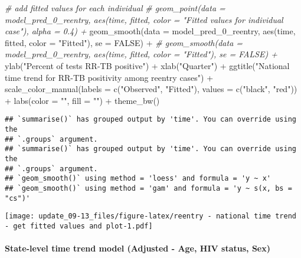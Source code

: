 \documentclass[
]{article}
\newenvironment{Shaded}{\begin{snugshade}}{\end{snugshade}}
\newcommand{\AttributeTok}[1]{\textcolor[rgb]{0.77,0.63,0.00}{#1}}
\newcommand{\CommentTok}[1]{\textcolor[rgb]{0.56,0.35,0.01}{\textit{#1}}}
\newcommand{\ConstantTok}[1]{\textcolor[rgb]{0.00,0.00,0.00}{#1}}
\newcommand{\FunctionTok}[1]{\textcolor[rgb]{0.00,0.00,0.00}{#1}}
\newcommand{\NormalTok}[1]{#1}
\newcommand{\SpecialCharTok}[1]{\textcolor[rgb]{0.00,0.00,0.00}{#1}}
\newcommand{\StringTok}[1]{\textcolor[rgb]{0.31,0.60,0.02}{#1}}
\begin{document}
\begin{Shaded}
\begin{Highlighting}[]
  \CommentTok{\# add fitted values for each individual}
  \CommentTok{\# geom\_point(data = model\_pred\_0\_reentry, aes(time, fitted, color = "Fitted values for individual case"), alpha = 0.4) + }
  \FunctionTok{geom\_smooth}\NormalTok{(}\AttributeTok{data =}\NormalTok{ model\_pred\_0\_reentry, }\FunctionTok{aes}\NormalTok{(time, fitted, }\AttributeTok{color =} \StringTok{"Fitted"}\NormalTok{), }\AttributeTok{se =} \ConstantTok{FALSE}\NormalTok{) }\SpecialCharTok{+} 
  \CommentTok{\# geom\_smooth(data = model\_pred\_0\_reentry, aes(time, fitted, color = "Fitted"), se = FALSE) + }
  \FunctionTok{ylab}\NormalTok{(}\StringTok{"Percent of tests RR{-}TB positive"}\NormalTok{) }\SpecialCharTok{+} 
  \FunctionTok{xlab}\NormalTok{(}\StringTok{"Quarter"}\NormalTok{) }\SpecialCharTok{+} 
  \FunctionTok{ggtitle}\NormalTok{(}\StringTok{"National time trend for RR{-}TB positivity among reentry cases"}\NormalTok{) }\SpecialCharTok{+} 
  \FunctionTok{scale\_color\_manual}\NormalTok{(}\AttributeTok{labels =} \FunctionTok{c}\NormalTok{(}\StringTok{"Observed"}\NormalTok{, }\StringTok{"Fitted"}\NormalTok{), }
                    \AttributeTok{values =} \FunctionTok{c}\NormalTok{(}\StringTok{"black"}\NormalTok{,  }\StringTok{"red"}\NormalTok{)) }\SpecialCharTok{+} 
  \FunctionTok{labs}\NormalTok{(}\AttributeTok{color =} \StringTok{""}\NormalTok{, }\AttributeTok{fill =} \StringTok{""}\NormalTok{) }\SpecialCharTok{+} 
  \FunctionTok{theme\_bw}\NormalTok{()}
\end{Highlighting}
\end{Shaded}

\begin{verbatim}
## `summarise()` has grouped output by 'time'. You can override using the
## `.groups` argument.
## `summarise()` has grouped output by 'time'. You can override using the
## `.groups` argument.
## `geom_smooth()` using method = 'loess' and formula = 'y ~ x'
## `geom_smooth()` using method = 'gam' and formula = 'y ~ s(x, bs = "cs")'
\end{verbatim}

\texttt{[image: update\_09-13\_files/figure-latex/reentry - national time trend - get fitted values and plot-1.pdf]}

\newpage

\hypertarget{state-level-time-trend-model-adjusted---age-hiv-status-sex}{%
\paragraph{State-level time trend model (Adjusted - Age, HIV status,
Sex)}\label{state-level-time-trend-model-adjusted---age-hiv-status-sex}}
\end{document}
